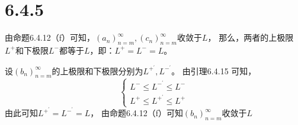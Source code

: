 \documentclass{article}
\theoremstyle{mystyle}
\begin{document}
\section*{6.4.5}

由命题6.4.12（f）可知，$(a_n)_{n=m}^\infty,(c_n)_{n=m}^\infty$收敛于$L$，
那么，两者的上极限$L^+$和下极限$L^-$都等于$L$，即：$L^+ = L^- = L$。

设$(b_n)_{n=m}^\infty$的上极限和下极限分别为$L^{+^\prime},L^{-^\prime}$。
由引理6.4.15 可知，
\begin{equation}
  \begin{cases*}
    L^- \leq L^{-^\prime} \leq L^- \\
    L^+ \leq L^{+^\prime} \leq L^+
  \end{cases*}
\end{equation}
由此可知$L^{+^\prime}=L^{-^\prime}=L$，
由命题6.4.12（f）可知$(b_n)_{n=m}^\infty$收敛于$L$
\end{document}
